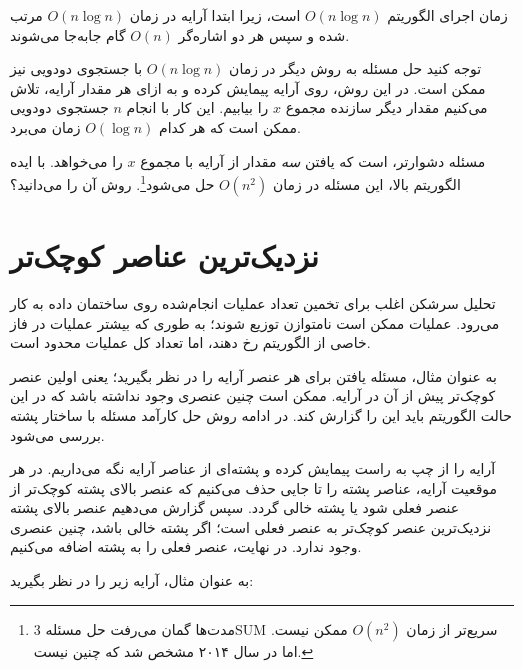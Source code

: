 زمان اجرای الگوریتم
$O(n \log n)$ است، زیرا ابتدا
آرایه در زمان $O(n \log n)$ مرتب شده
و سپس هر دو اشاره‌گر $O(n)$ گام جابه‌جا می‌شوند.

توجه کنید حل مسئله
به روش دیگر در زمان $O(n \log n)$ با جستجوی دودویی نیز ممکن است.
در این روش، روی آرایه پیمایش کرده
و به ازای هر مقدار آرایه، تلاش می‌کنیم مقدار دیگر
سازنده مجموع $x$ را بیابیم.
این کار با انجام $n$ جستجوی دودویی ممکن است
که هر کدام $O(\log n)$ زمان می‌برد.

مسئله دشوارتر،  است که یافتن \emph{سه} مقدار از آرایه با مجموع $x$ را می‌خواهد.
با ایده الگوریتم بالا، این مسئله در زمان $O(n^2)$ حل می‌شود\footnote{مدت‌ها گمان می‌رفت حل مسئله 3SUM سریع‌تر از زمان $O(n^2)$ ممکن نیست.
اما در سال ۲۰۱۴ مشخص شد \cite{gro14} که چنین نیست.}.
روش آن را می‌دانید؟

\section{نزدیک‌ترین عناصر کوچک‌تر}


تحلیل سرشکن اغلب برای تخمین تعداد عملیات انجام‌شده روی ساختمان داده به کار می‌رود.
عملیات ممکن است نامتوازن توزیع شوند؛ به طوری که بیشتر عملیات در فاز خاصی از الگوریتم رخ دهند، اما تعداد کل عملیات محدود است.

به عنوان مثال، مسئله یافتن  برای هر عنصر آرایه را در نظر بگیرید؛ یعنی اولین عنصر کوچک‌تر پیش از آن در آرایه.
ممکن است چنین عنصری وجود نداشته باشد که در این حالت الگوریتم باید این را گزارش کند.
در ادامه روش حل کارآمد مسئله با ساختار پشته بررسی می‌شود.

آرایه را از چپ به راست پیمایش کرده و پشته‌ای از عناصر آرایه نگه می‌داریم.
در هر موقعیت آرایه، عناصر پشته را تا جایی حذف می‌کنیم که عنصر بالای پشته کوچک‌تر از عنصر فعلی شود یا پشته خالی گردد.
سپس گزارش می‌دهیم عنصر بالای پشته نزدیک‌ترین عنصر کوچک‌تر به عنصر فعلی است؛ اگر پشته خالی باشد، چنین عنصری وجود ندارد.
در نهایت، عنصر فعلی را به پشته اضافه می‌کنیم.

به عنوان مثال، آرایه زیر را در نظر بگیرید:
\begin{center}
\end{center}

